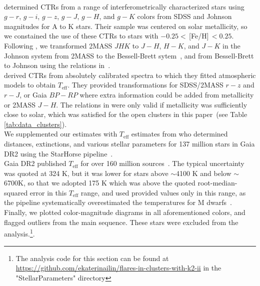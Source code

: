 \documentclass{aa}
\begin{document}
\\
\citet{boyajian_stellar_2013} determined CTRs from a range of interferometrically characterized stars using $g-r$, $g-i$, $g-z$, $g-J$, $g-H$, and $g-K$ colors from SDSS and Johnson magnitudes for A to K stars. Their sample was centered on solar metallicity, so we constained the use of these CTRs to stars with $-0.25<$\,[Fe/H]$\,<0.25$. Following \citet{boyajian_stellar_2013}, we transformed 2MASS $JHK$ to $J-H$, $H-K$, and $J-K$ in the Johnson system from 2MASS to the Bessell-Brett sytem~\citep{carpenter_color_2001}, and from Bessell-Brett to Johnson using the relations in~\citet{bessell_brett_1988}. 
\\
\citet{mann_how_2015} derived CTRs from absolutely calibrated spectra to which they fitted atmospheric models to obtain $T_\mathrm{eff}$. %
They provided transformations for SDSS/2MASS $r-z$ and $r-J$, or Gaia $BP-RP$ where extra information could be added from metallicity or 2MASS $J-H$. The relations in \citet{mann_how_2015} were only valid if metallicity was sufficiently close to solar, which was satisfied for the open clusters in this paper~(see Table \ref{tab:data_clusters}). 
\\
We supplemented our estimates with $T_\mathrm{eff}$ estimates from \citet{anders_starhorse_2019} who determined distances, extinctions, and various stellar parameters for 137 million stars in Gaia DR2 using the StarHorse pipeline~\citep{queiroz_starhorse_2018}.
\\
Gaia DR2 published $T_\mathrm{eff}$ for over 160 million sources~\citep{gaia2018}. The typical uncertainty was quoted at 324 K, but it was lower for stars above $\sim$4100 K and below $\sim$6700K, so that we adopted 175 K which was above the quoted root-median-squared error in this $T_\mathrm{eff}$ range, and used provided values only in this range, as the pipeline systematically overestimated the temperatures for M dwarfs~\citep{andrae_gaiaapsis_2018,kesseli2019}. 
\\ 
Finally, we plotted color-magnitude diagrams in all aforementioned colors, and flagged outliers from the main sequence. These stars were excluded from the analysis.\footnote{The analysis code for this section can be found at \url{https://github.com/ekaterinailin/flares-in-clusters-with-k2-ii} in the "StellarParameters" directory}.

\end{document}
